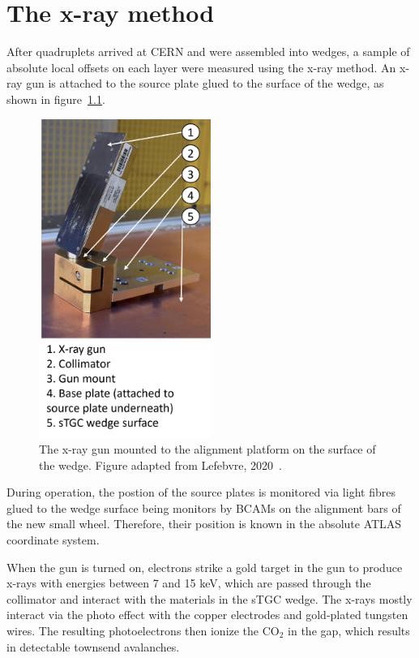 
\chapter{The x-ray method}
\label{chap:x_ray}

After quadruplets arrived at CERN and were assembled into wedges, a sample of absolute local offsets on each layer were measured using the x-ray method\cite{lefebvre_precision_2020}. An x-ray gun is attached to the source plate glued to the surface of the wedge, as shown in figure~\ref{fig:xray_setup}.

\begin{figure}
    \centering
    \includegraphics[width = 0.5\textwidth]{figures/figure_xray_setup.pdf}
    \caption{The x-ray gun mounted to the alignment platform on the surface of the wedge. Figure adapted from Lefebvre, 2020~\cite{lefebvre_precision_2020}.}
    \label{fig:xray_setup}
\end{figure}

During operation, the postion of the source plates is monitored via light fibres glued to the wedge surface being monitors by BCAMs on the alignment bars of the new small wheel. Therefore, their position is known in the absolute ATLAS coordinate system. 

When the gun is turned on, electrons strike a gold target in the gun to produce x-rays with energies between 7 and 15 keV, which are passed through the collimator and interact with the materials in the sTGC wedge. The x-rays mostly interact via the photo effect with the copper electrodes and gold-plated tungsten wires. The resulting photoelectrons then ionize the CO$_2$ in the gap, which results in detectable townsend avalanches. 

